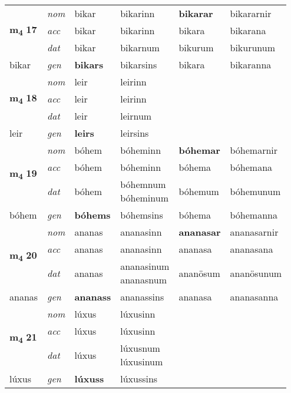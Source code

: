 \begin{longtable}[l]{X>{\footnotesize\itshape}XXXXX}
\multirow{3}{*}{{{\textbf{m{\textsubscript{4}}} \Large{\textbf{17}}}}}  
 & nom & bikar & bikarinn    & \textbf{bikarar} & bikararnir  \\*
 & acc & bikar  & bikarinn   & bikara  & bikarana \\*
 & dat & bikar & bikarnum   & bikurum & bikurunum \\*
 {\footnotesize{bikar}} &  gen & \textbf{bikars}  & bikarsins  & bikara & bikaranna \\
\cmidrule{1-6}


\multirow{3}{*}{{{\textbf{m{\textsubscript{4}}} \Large{\textbf{18}}}}}  
 & nom & leir & leirinn    & \textbf{} &   \\*
 & acc & leir  & leirinn   &   &  \\*
 & dat & leir & leirnum   &  &  \\*
 {\footnotesize{leir}} &  gen & \textbf{leirs}  & leirsins  &  &  \\
\cmidrule{1-6}


\multirow{3}{*}{{{\textbf{m{\textsubscript{4}}} \Large{\textbf{19}}}}}  
 & nom & bóhem & bóheminn    & \textbf{bóhemar} & bóhemarnir  \\*
 & acc & bóhem  & bóheminn   & bóhema  & bóhemana \\*
 & dat & bóhem & \specialcell{bóhemnum\\ bóheminum}   & bóhemum & bóhemunum \\*
 {\footnotesize{bóhem}} &  gen & \textbf{bóhems}  & bóhemsins  & bóhema & bóhemanna \\
\cmidrule{1-6}


\multirow{3}{*}{{{\textbf{m{\textsubscript{4}}} \Large{\textbf{20}}}}}  
 & nom & ananas & ananasinn    & \textbf{ananasar} & ananasarnir  \\*
 & acc & ananas  & ananasinn   & ananasa  & ananasana \\*
 & dat & ananas & \specialcell{ananasinum\\ ananasnum}   & ananösum & ananösunum \\*
 {\footnotesize{ananas}} &  gen & \textbf{ananass}  & ananassins  & ananasa & ananasanna \\
\cmidrule{1-6}


\multirow{3}{*}{{{\textbf{m{\textsubscript{4}}} \Large{\textbf{21}}}}}  
 & nom & lúxus & lúxusinn    & \textbf{} &   \\*
 & acc & lúxus  & lúxusinn   &   &  \\*
 & dat & lúxus & \specialcell{lúxusnum\\ lúxusinum}   &  &  \\*
 {\footnotesize{lúxus}} &  gen & \textbf{lúxuss}  & lúxussins  &  &  \\
\cmidrule{1-6}



\end{longtable}
